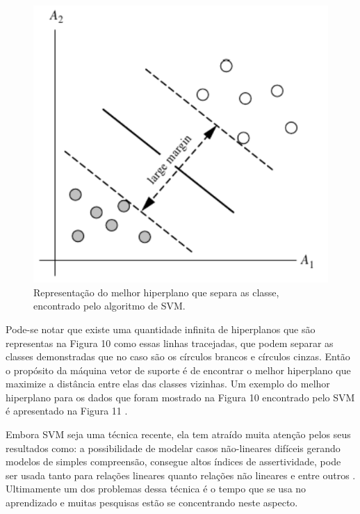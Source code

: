 \begin{figure}[!htp]
	\begin{center}
    \caption{\label{fig:waveform_fig} Representação do melhor hiperplano que separa as classe, encontrado pelo algoritmo de SVM.}
	\includegraphics[scale=0.50]{Figuras/SVM_2.png}
	\end{center}
\end{figure}

\par
Pode-se notar que existe uma quantidade infinita de hiperplanos que são representas na Figura 10 como essas linhas tracejadas, que podem separar as classes demonstradas que no caso são os círculos brancos e círculos cinzas. Então o propósito da máquina vetor de suporte é de encontrar o melhor hiperplano que maximize a distância entre elas das classes vizinhas. Um exemplo do melhor hiperplano para os dados que foram mostrado na Figura 10 encontrado pelo SVM é apresentado na Figura 11 \cite{Costa2012}. 


\par
Embora SVM seja uma técnica recente, ela tem atraído muita atenção pelos seus resultados como: a possibilidade de modelar casos não-lineares difíceis gerando modelos de simples compreensão, consegue altos índices de assertividade, pode ser usada tanto para relações lineares quanto relações não lineares e entre outros \cite{Camilo2009}. Ultimamente um dos problemas dessa técnica é o tempo que se usa no aprendizado e muitas pesquisas estão se concentrando neste aspecto. 


